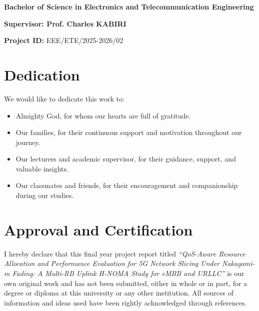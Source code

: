 \documentclass[
]{article}
\begin{document}
\begin{titlepage}
{\begin{minipage}{0.94\textwidth}
\textbf{Bachelor of Science in Electronics and Telecommunication Engineering}

\vspace{0.15cm}

\textbf{Supervisor: Prof. Charles KABIRI}

\vspace{0.15cm}
\end{minipage}
}

\vspace{0.6cm}

\begin{flushleft}
\textbf{Project ID:} EEE/ETE/2025-2026/02
\end{flushleft}
\end{titlepage}

\section*{Dedication}
\vspace{1cm}

We would like to dedicate this work to:

\begin{itemize}
    \item Almighty God, for whom our hearts are full of gratitude.
    
    \item Our families, for their continuous support and motivation throughout our journey.
    
    \item Our lecturers and academic supervisor, for their guidance, support, and valuable insights.
    
    \item Our classmates and friends, for their encouragement and companionship during our studies.
\end{itemize}

\vspace*{\fill}
\clearpage

\section*{Approval and Certification}

I hereby declare that this final year project report titled
\textit{``QoS-Aware Resource Allocation and Performance
Evaluation for 5G Network Slicing Under
Nakagami-m Fading: A Multi-RB Uplink
H-NOMA Study for eMBB and URLLC''}
is our own original work and has not been submitted, either in whole or in part, for a degree or diploma at this university or any other institution. All sources of information and ideas used have been rightly acknowledged through references.
\end{document}
